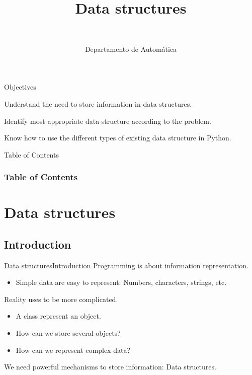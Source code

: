 \documentclass[10pt,compress]{beamer} %
\title[Data structures]{Data structures}
\author{\asignatura\\\carrera}
\institute{}
\date{Departamento de Automática}
\begin{document}
{\titlepageBlue
    \begin{frame}
        \titlepage
    \end{frame}
}

\institute{\asignatura}

\begin{frame}[plain]{}
	\begin{block}{Objectives}
		\begin{enumerate}
		\item Understand the need to store information in data structures.
		\item Identify most appropriate data structure according to the problem.
         {
		    \item Know how to use the different types of existing data structure in Python.
        }
		\end{enumerate}
	\end{block}
\end{frame}

{
\begin{frame}[shrink]{Table of Contents}
 \frametitle{Table of Contents}
 \tableofcontents
\end{frame}
}

\section{Data structures}
\subsection{Introduction}
\begin{frame}{Data structures}{Introduction}
	Programming is about information representation.
	\begin{itemize}
		\item Simple data are easy to represent: Numbers, characters, strings, etc.
	\end{itemize}
	Reality uses to be more complicated.
	\begin{itemize}
		\item A class represent an object.
		\item How can we store several objects?
		\item How can we represent complex data?
	\end{itemize}
	We need powerful mechanisms to store information: Data structures.
\end{frame}
\end{document}
